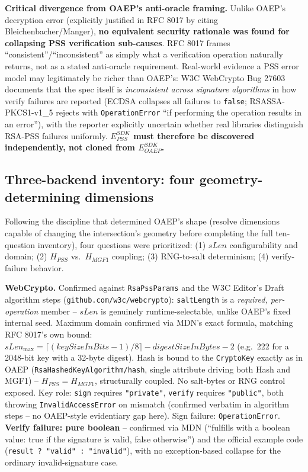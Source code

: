 \documentclass[11pt,a4paper]{article}
\begin{document}
\textbf{Critical divergence from OAEP's anti-oracle framing.} Unlike OAEP's decryption error (explicitly justified in RFC 8017 by citing Bleichenbacher/Manger), \textbf{no equivalent security rationale was found for collapsing PSS verification sub-causes}. RFC 8017 frames ``consistent''/``inconsistent'' as simply what a verification operation naturally returns, not as a stated anti-oracle requirement. Real-world evidence a PSS error model may legitimately be richer than OAEP's: W3C WebCrypto Bug 27603 documents that the spec itself is \emph{inconsistent across signature algorithms} in how verify failures are reported (ECDSA collapses all failures to \texttt{false}; RSASSA-PKCS1-v1\_5 rejects with \texttt{OperationError} ``if performing the operation results in an error''), with the reporter explicitly uncertain whether real libraries distinguish RSA-PSS failures uniformly. \textbf{$E_{PSS}^{SDK}$ must therefore be discovered independently, not cloned from $E_{OAEP}^{SDK}$.}

\subsection{Three-backend inventory: four geometry-determining dimensions}
Following the discipline that determined OAEP's shape (resolve dimensions capable of changing the intersection's geometry before completing the full ten-question inventory), four questions were prioritized: (1) $sLen$ configurability and domain; (2) $H_{PSS}$ vs.\ $H_{MGF1}$ coupling; (3) RNG-to-salt determinism; (4) verify-failure behavior.

\textbf{WebCrypto.} Confirmed against \texttt{RsaPssParams} and the W3C Editor's Draft algorithm steps (\texttt{github.com/w3c/webcrypto}): \texttt{saltLength} is a \emph{required, per-operation} member -- $sLen$ is genuinely runtime-selectable, unlike OAEP's fixed internal seed. Maximum domain confirmed via MDN's exact formula, matching RFC 8017's own bound: $sLen_{\max} = \lceil (keySizeInBits-1)/8 \rceil - digestSizeInBytes - 2$ (e.g.\ 222 for a 2048-bit key with a 32-byte digest). Hash is bound to the \texttt{CryptoKey} exactly as in OAEP (\texttt{RsaHashedKeyAlgorithm/hash}, single attribute driving both Hash and MGF1) -- $H_{PSS}=H_{MGF1}$, structurally coupled. No salt-bytes or RNG control exposed. Key role: \texttt{sign} requires \texttt{"private"}, \texttt{verify} requires \texttt{"public"}, both throwing \texttt{InvalidAccessError} on mismatch (confirmed verbatim in algorithm steps -- no OAEP-style evidentiary gap here). Sign failure: \texttt{OperationError}. \textbf{Verify failure: pure boolean} -- confirmed via MDN (``fulfills with a boolean value: true if the signature is valid, false otherwise'') and the official example code (\texttt{result ? "valid" : "invalid"}), with no exception-based collapse for the ordinary invalid-signature case.
\end{document}
